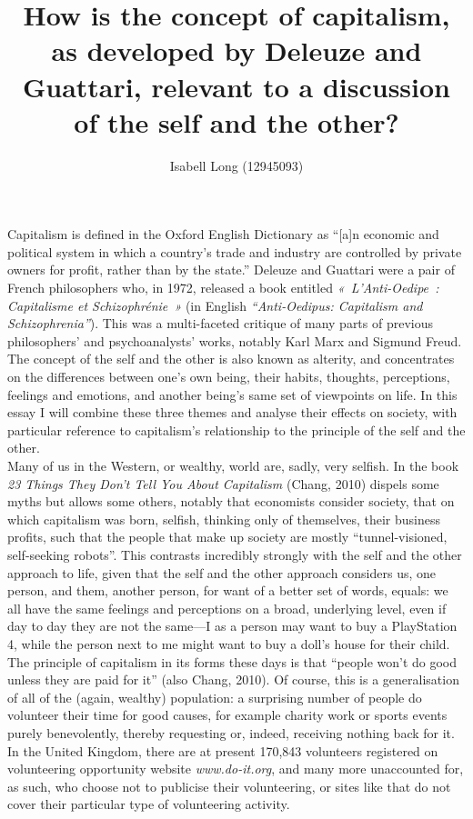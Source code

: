 \documentclass[12pt,a4paper]{article}
\begin{document}
\title{How is the concept of capitalism, as developed by Deleuze and
       Guattari, relevant to a discussion of the self and the other?}
\author{Isabell Long (12945093)}
\maketitle

Capitalism is defined in the Oxford English Dictionary as ``[a]n
economic and political system in which a country's trade and industry
are controlled by private owners for profit, rather than by the
state.'' Deleuze and Guattari were a pair of French philosophers who,
in 1972, released a book entitled \textit{«~L'Anti-Oedipe~:
Capitalisme et Schizophrénie~»} (in English \textit{``Anti-Oedipus:
Capitalism and Schizophrenia''}). This was a multi-faceted critique of
many parts of previous philosophers' and psychoanalysts' works,
notably Karl Marx and Sigmund Freud. The concept of the self and the
other is also known as alterity, and concentrates on the differences
between one's own being, their habits, thoughts, perceptions, feelings
and emotions, and another being's same set of viewpoints on life. In
this essay I will combine these three themes and analyse their effects
on society, with particular reference to capitalism's relationship to
the principle of the self and the other.\\

Many of us in the Western, or wealthy, world are, sadly, very selfish.
In the book \textit{23 Things They Don't Tell You About Capitalism}
(Chang, 2010) dispels some myths but allows some others, notably that
economists consider society, that on which capitalism was born,
selfish, thinking only of themselves, their business profits, such
that the people that make up society are mostly ``tunnel-visioned,
self-seeking robots''. This contrasts incredibly strongly with the
self and the other approach to life, given that the self and the other
approach considers us, one person, and them, another person, for want
of a better set of words, equals: we all have the same feelings and
perceptions on a broad, underlying level, even if day to day they are
not the same---I as a person may want to buy a PlayStation 4, while
the person next to me might want to buy a doll's house for their
child. The principle of capitalism in its forms these days is that
``people won't do good unless they are paid for it'' (also Chang,
2010). Of course, this is a generalisation of all of the (again,
wealthy) population: a surprising number of people do volunteer their
time for good causes, for example charity work or sports events purely
benevolently, thereby requesting or, indeed, receiving nothing back
for it. In the United Kingdom, there are at present 170,843 volunteers
registered on volunteering opportunity website \textsl{www.do-it.org},
and many more unaccounted for, as such, who choose not to publicise
their volunteering, or sites like that do not cover their particular
type of volunteering activity.\\
\end{document}
